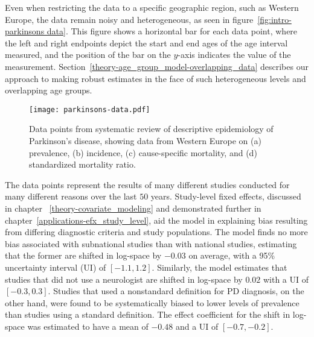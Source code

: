 Even when restricting the data to a
specific geographic region, such as Western Europe, the data remain
noisy and heterogeneous, as seen in figure~\ref{fig:intro-parkinsons
  data}. This figure shows a horizontal bar for each data point, where
the left and right endpoints depict the start and end ages of the age
interval measured, and the position of the bar on the $y$-axis indicates the value of the
measurement. Section~\ref{theory-age_group_model-overlapping_data}
describes our approach to making
robust estimates in the face of such heterogeneous levels and
overlapping age groups.

    \begin{figure}[h]
        \begin{center}
            \texttt{[image: parkinsons-data.pdf]}
            \caption[Systematic review data for Parkinson's disease.]{Data points from systematic review of descriptive
              epidemiology of Parkinson's disease, showing data from
              Western Europe on (a) prevalence, (b) incidence, (c)
              cause-specific mortality, and (d) standardized mortality
              ratio.}
            \label{fig:intro-parkinsons data}
        \end{center}
    \end{figure}

The data points represent the results
of many different studies conducted for many different reasons over the last $50$ years.
Study-level fixed effects, discussed in chapter
~\ref{theory-covariate_modeling} and demonstrated further in
chapter~\ref{applications-efx_study_level}, aid the model in
explaining bias resulting from differing diagnostic criteria and study
populations.  The model finds no more bias associated with subnational
studies than with national studies, estimating that the former are
shifted in log-space by $-0.03$ on average, with a 95\% uncertainty
interval (UI) of $[-1.1, 1.2]$.  Similarly, the model estimates that studies that did not use a
neurologist are shifted in log-space by $0.02$ with a
UI of $[-0.3, 0.3]$.  Studies that used a nonstandard definition for PD
diagnosis, on the other hand, were found to be systematically biased
to lower levels of prevalence than studies using a standard definition. The
effect coefficient for the shift in log-space was estimated to have a
mean of $-0.48$ and a UI of $[-0.7, -0.2]$.

